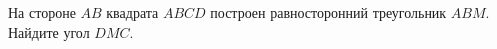 \begin{ex}
	\begin{condition}
		На стороне \( AB  \) квадрата \( ABCD  \) построен равносторонний треугольник \( ABM  \). Найдите угол \( DMC \).
	\end{condition}
\end{ex}